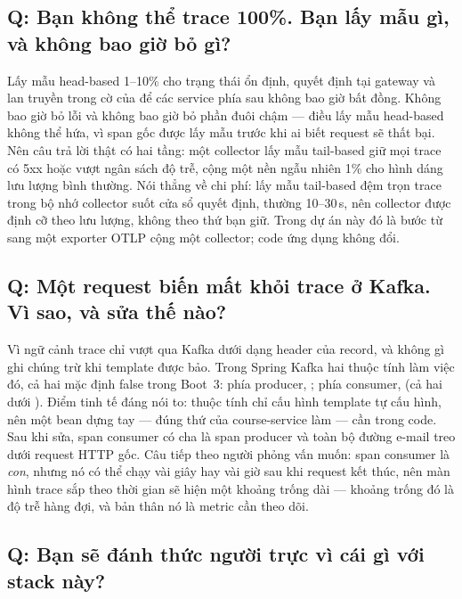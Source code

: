 \subsection*{Q: Bạn không thể trace 100\%. Bạn lấy mẫu gì, và không bao giờ bỏ gì?}

Lấy mẫu head-based 1--10\% cho trạng thái ổn định, quyết định tại
gateway và lan truyền trong cờ của  để các service
phía sau không bao giờ bất đồng. Không bao giờ bỏ lỗi và không bao giờ
bỏ phần đuôi chậm --- điều lấy mẫu head-based không thể hứa, vì span
gốc được lấy mẫu trước khi ai biết request sẽ thất bại. Nên câu trả lời
thật có hai tầng: một collector lấy mẫu tail-based giữ mọi trace có 5xx
hoặc vượt ngân sách độ trễ, cộng một nền ngẫu nhiên 1\% cho hình dáng
lưu lượng bình thường. Nói thẳng về chi phí: lấy mẫu tail-based đệm
trọn trace trong bộ nhớ collector suốt cửa sổ quyết định, thường
10--30\,s, nên collector được định cỡ theo lưu lượng, không theo thứ
bạn giữ. Trong dự án này đó là bước từ 
sang một exporter OTLP cộng một collector; code ứng dụng không đổi.

\subsection*{Q: Một request biến mất khỏi trace ở Kafka. Vì sao, và sửa thế nào?}

Vì ngữ cảnh trace chỉ vượt qua Kafka dưới dạng header của record, và
không gì ghi chúng trừ khi template được bảo. Trong Spring Kafka hai
thuộc tính làm việc đó, cả hai mặc định false trong Boot~3: phía
producer, ; phía consumer,
 (cả hai dưới ).
Điểm tinh tế đáng nói to: thuộc tính chỉ cấu hình template tự cấu hình,
nên một bean  dựng tay --- đúng thứ
 của course-service làm --- cần
 trong code. Sau khi sửa, span
consumer có cha là span producer và toàn bộ đường e-mail treo dưới
request HTTP gốc. Câu tiếp theo người phỏng vấn muốn: span consumer là
\emph{con}, nhưng nó có thể chạy vài giây hay vài giờ sau khi request
kết thúc, nên màn hình trace sắp theo thời gian sẽ hiện một khoảng
trống dài --- khoảng trống đó là độ trễ hàng đợi, và bản thân nó là
metric cần theo dõi.

\subsection*{Q: Bạn sẽ đánh thức người trực vì cái gì với stack này?}

